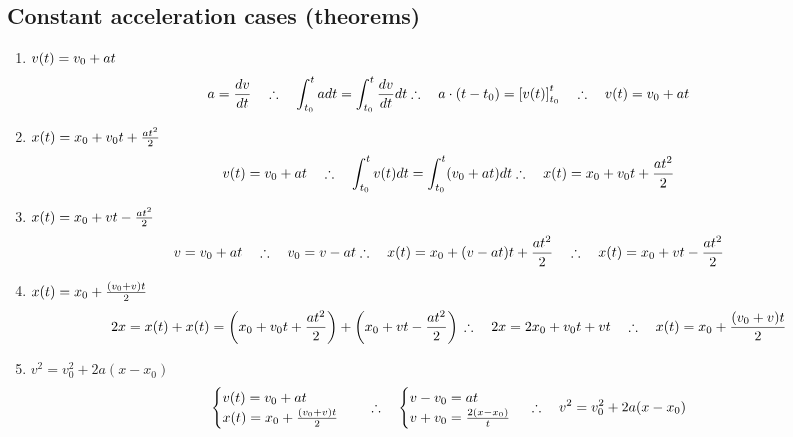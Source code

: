     \subsection{Constant acceleration cases (theorems)}
        \begin{enumerate}
            \item $v(t)=v_0+at$
                \begin{equation}
                    a = \dfrac{dv}{dt} \quad \therefore \quad \int_{t_0}^t a dt=\int_{t_0}^t \dfrac{dv}{dt} dt \\
                    \therefore \quad a \cdot (t-t_ 0)=\left[v(t)\right]_{t_0}^t  \quad \therefore \quad v(t) = v_0 + at
                \end{equation}
            \item $x(t) = x_0 + v_0t + \frac{at^2}{2}$
                \begin{equation}
                    v(t) = v_0 + at \quad \therefore \quad \int_{t_0}^t v(t) dt = \int_{t_0}^t (v_0 + at)dt \\
                    \therefore \quad x(t) = x_0 + v_0t + \frac{at^2}{2}
                \end{equation}
            \item $x(t) = x_0 + vt - \frac{at^2}{2}$
                \begin{equation}
                    v = v_0 + at \quad \therefore \quad v_0=v-at \\
                    \therefore \quad x(t) = x_0 + (v-at)t + \frac{at^2}{2} \quad \therefore \quad x(t) = x_0 + vt - \frac{at^2}{2}
                \end{equation}
            \item $x(t) = x_0 + \frac{(v_0+v)t}{2}$
                \begin{equation}
                    2x = x(t)+x(t) = \left( x_0 + v_0t + \frac{at^2}{2} \right) + \left(x_0 + vt - \frac{at^2}{2}\right) \\
                    \therefore \quad 2x = 2x_0 + v_0t + vt \quad \therefore \quad x(t) = x_0 + \frac{(v_0+v)t}{2}
                \end{equation}
            \item $v^2 = v_0^2 + 2a(x-x_0)$
                \begin{equation}
                    \begin{cases} v(t) = v_0 + at \\
                    x(t) = x_0 + \frac{(v_0+v)t}{2} \end{cases}
                    \quad \therefore \quad \begin{cases}
                        v-v_0=at \\
                        v+v_0 = \frac{2(x-x_0)}{t}
                    \end{cases} \\
                    \therefore \quad v^2 = v_0^2 + 2a(x-x_0)
                \end{equation}
        \end{enumerate}
